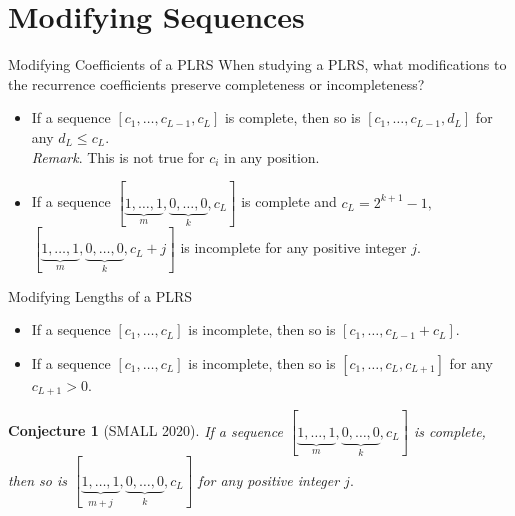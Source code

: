 \documentclass{beamer}
\newtheorem*{conjecture}{Conjecture}
\begin{document}
\section{Modifying Sequences}
\begin{frame}{Modifying Coefficients of a PLRS}
When studying a PLRS, what modifications to the recurrence coefficients preserve completeness or incompleteness?
\pause
\begin{theorem}[SMALL 2020]
\begin{itemize}
    \item If a sequence $[c_1, \ldots, c_{L-1}, c_L]$ is complete, then so is $[c_1, \ldots, c_{L-1}, d_L]$ for any $d_L \leq c_L$.\\
    \emph{Remark}. This is not true for $c_i$ in any position.\\
    \item If a sequence $[\underbrace{1, \ldots,1}_m,\underbrace{0,\ldots,0}_k, c_{L}]$ is complete and $c_{L}=2^{k+1}-1,$ $[\underbrace{1, \ldots,1}_m,\underbrace{0,\ldots,0}_k, c_{L}+j]$ is incomplete for any positive integer $j$.
\end{itemize}
\end{theorem}
\end{frame}
\begin{frame}{Modifying Lengths of a PLRS}
\begin{theorem}[SMALL 2020]
\begin{itemize}
\item If a sequence $[c_1, \ldots, c_L]$ is incomplete, then so is $[c_1, \ldots, c_{L-1}+c_L]$.
    \item If a sequence $[c_1, \ldots, c_{L}]$ is incomplete, then so is $[c_1, \ldots, c_{L}, c_{L+1}]$ for any $c_{L+1} > 0$.
\end{itemize}
\end{theorem}

\pause 

\begin{conjecture}[SMALL 2020]
If a sequence $[\underbrace{1, \ldots,1}_m,\underbrace{0,\ldots,0}_k, c_{L}]$  is complete, then so is  $[\underbrace{1, \ldots,1}_{m+j},\underbrace{0,\ldots,0}_k, c_{L}]$ for any positive integer $j.$
\end{conjecture}
\end{frame}
\end{document}
